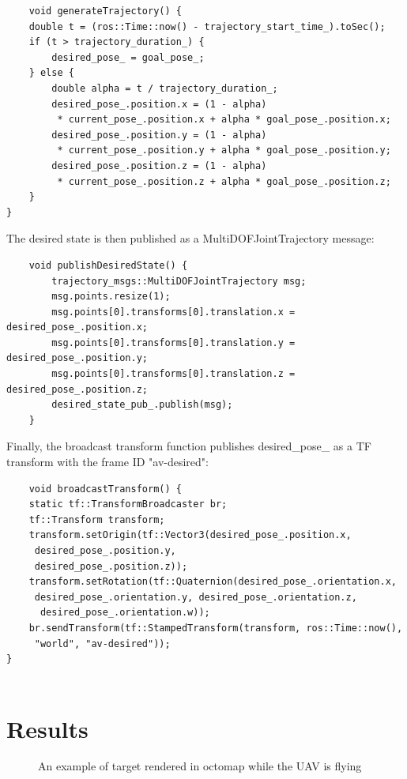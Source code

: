 \documentclass{article}
\begin{document}
\begin{lstlisting}
    void generateTrajectory() {
    double t = (ros::Time::now() - trajectory_start_time_).toSec();
    if (t > trajectory_duration_) {
        desired_pose_ = goal_pose_;
    } else {
        double alpha = t / trajectory_duration_;
        desired_pose_.position.x = (1 - alpha)
         * current_pose_.position.x + alpha * goal_pose_.position.x;
        desired_pose_.position.y = (1 - alpha)
         * current_pose_.position.y + alpha * goal_pose_.position.y;
        desired_pose_.position.z = (1 - alpha)
         * current_pose_.position.z + alpha * goal_pose_.position.z;
    }
}

\end{lstlisting}
The desired state is then published as a MultiDOFJointTrajectory message:

\begin{lstlisting}
    void publishDesiredState() {
        trajectory_msgs::MultiDOFJointTrajectory msg;
        msg.points.resize(1);
        msg.points[0].transforms[0].translation.x = desired_pose_.position.x;
        msg.points[0].transforms[0].translation.y = desired_pose_.position.y;
        msg.points[0].transforms[0].translation.z = desired_pose_.position.z;
        desired_state_pub_.publish(msg);
    }    
\end{lstlisting}
Finally, the broadcast transform function publishes desired\_pose\_ as a TF transform with the frame ID "av-desired":

\begin{lstlisting}
    void broadcastTransform() {
    static tf::TransformBroadcaster br;
    tf::Transform transform;
    transform.setOrigin(tf::Vector3(desired_pose_.position.x,
     desired_pose_.position.y,
     desired_pose_.position.z));
    transform.setRotation(tf::Quaternion(desired_pose_.orientation.x,
     desired_pose_.orientation.y, desired_pose_.orientation.z,
      desired_pose_.orientation.w));
    br.sendTransform(tf::StampedTransform(transform, ros::Time::now(),
     "world", "av-desired"));
}
 
\end{lstlisting}


\section{Results}

\begin{figure}[h]
    \centering
        \caption{An example of target rendered in octomap while the UAV is flying}
        \label{fig:GUI}
    \end{figure}
\end{document}
